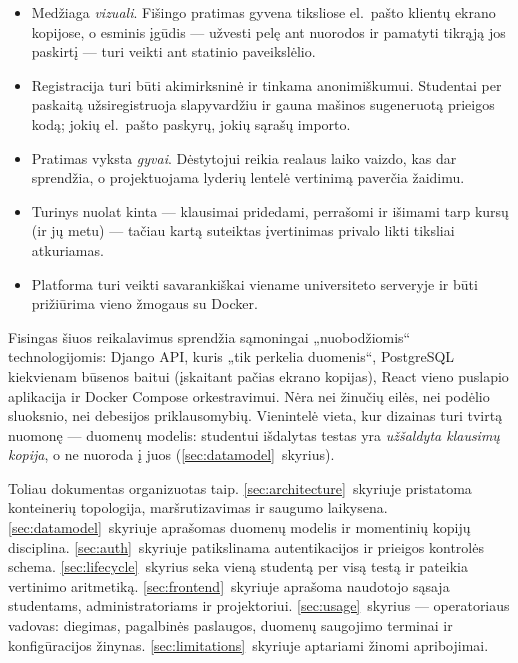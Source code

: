 \documentclass[11pt,a4paper]{article}
\begin{document}
\begin{itemize}
  \item Medžiaga \emph{vizuali}. Fišingo pratimas gyvena tiksliose
        el.~pašto klientų ekrano kopijose, o esminis įgūdis —
        užvesti pelę ant nuorodos ir pamatyti tikrąją jos paskirtį —
        turi veikti ant statinio paveikslėlio.
  \item Registracija turi būti akimirksninė ir tinkama anonimiškumui.
        Studentai per paskaitą užsiregistruoja slapyvardžiu ir gauna
        mašinos sugeneruotą prieigos kodą; jokių el.~pašto paskyrų,
        jokių sąrašų importo.
  \item Pratimas vyksta \emph{gyvai}. Dėstytojui reikia realaus laiko
        vaizdo, kas dar sprendžia, o projektuojama lyderių lentelė
        vertinimą paverčia žaidimu.
  \item Turinys nuolat kinta — klausimai pridedami, perrašomi ir
        išimami tarp kursų (ir jų metu) — tačiau kartą suteiktas
        įvertinimas privalo likti tiksliai atkuriamas.
  \item Platforma turi veikti savarankiškai viename universiteto
        serveryje ir būti prižiūrima vieno žmogaus su Docker.
\end{itemize}

Fisingas šiuos reikalavimus sprendžia sąmoningai „nuobodžiomis``
technologijomis: Django API, kuris „tik perkelia duomenis``,
PostgreSQL kiekvienam būsenos baitui (įskaitant pačias ekrano
kopijas), React vieno puslapio aplikacija ir Docker Compose
orkestravimui. Nėra nei žinučių eilės, nei podėlio sluoksnio, nei
debesijos priklausomybių. Vienintelė vieta, kur dizainas turi tvirtą
nuomonę — duomenų modelis: studentui išdalytas testas yra
\emph{užšaldyta klausimų kopija}, o ne nuoroda į juos
(\ref{sec:datamodel}~skyrius).

Toliau dokumentas organizuotas taip. \ref{sec:architecture}~skyriuje
pristatoma konteinerių topologija, maršrutizavimas ir saugumo
laikysena. \ref{sec:datamodel}~skyriuje aprašomas duomenų modelis ir
momentinių kopijų disciplina. \ref{sec:auth}~skyriuje patikslinama
autentikacijos ir prieigos kontrolės schema.
\ref{sec:lifecycle}~skyrius seka vieną studentą per visą testą ir
pateikia vertinimo aritmetiką. \ref{sec:frontend}~skyriuje aprašoma
naudotojo sąsaja studentams, administratoriams ir projektoriui.
\ref{sec:usage}~skyrius — operatoriaus vadovas: diegimas, pagalbinės
paslaugos, duomenų saugojimo terminai ir konfigūracijos žinynas.
\ref{sec:limitations}~skyriuje aptariami žinomi apribojimai.
\end{document}
